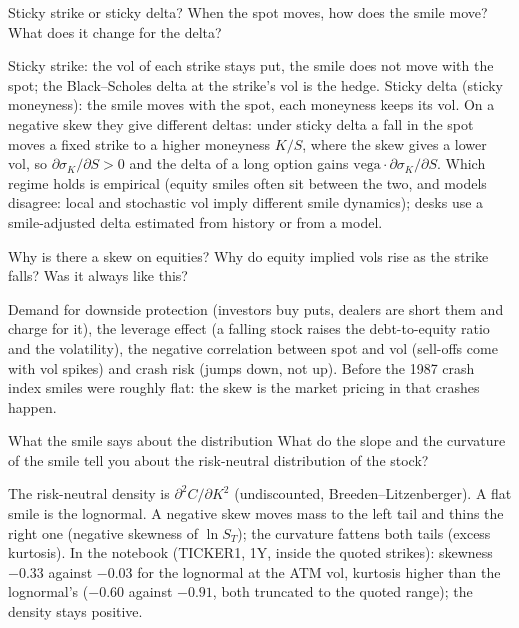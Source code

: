 \begin{question}{\Theory {}}{Sticky strike or sticky delta?}
When the spot moves, how does the smile move? What does it change for the delta?
\end{question}
\begin{answer}
Sticky strike: the vol of each strike stays put, the smile does not move with the spot; the Black--Scholes delta at
the strike's vol is the hedge. Sticky delta (sticky moneyness): the smile moves with the spot, each moneyness keeps its
vol. On a negative skew they give different deltas: under sticky delta a fall in the spot moves a fixed strike to a
higher moneyness $K/S$, where the skew gives a lower vol, so $\partial\sigma_K/\partial S > 0$ and the delta of a long
option gains $\text{vega}\cdot\partial\sigma_K/\partial S$. Which regime holds is empirical (equity smiles often sit
between the two, and models disagree: local and stochastic vol imply different smile dynamics); desks use a
smile-adjusted delta estimated from history or from a model.
\end{answer}

\begin{question}{\Theory {}}{Why is there a skew on equities?}
Why do equity implied vols rise as the strike falls? Was it always like this?
\end{question}
\begin{answer}
Demand for downside protection (investors buy puts, dealers are short them and charge for it), the leverage effect
(a falling stock raises the debt-to-equity ratio and the volatility), the negative correlation between spot and vol
(sell-offs come with vol spikes) and crash risk (jumps down, not up). Before the 1987 crash index smiles were roughly
flat: the skew is the market pricing in that crashes happen.
\end{answer}

\begin{question}{\Theory \Practice {}}{What the smile says about the distribution}
What do the slope and the curvature of the smile tell you about the risk-neutral distribution of the stock?
\end{question}
\begin{answer}
The risk-neutral density is $\partial^2C/\partial K^2$ (undiscounted, Breeden--Litzenberger). A flat smile is the
lognormal. A negative skew moves mass to the left tail and thins the right one (negative skewness of $\ln S_T$); the
curvature fattens both tails (excess kurtosis). In the notebook (TICKER1, 1Y, inside the quoted strikes): skewness
$-0.33$ against $-0.03$ for the lognormal at the ATM vol, kurtosis higher than the lognormal's ($-0.60$ against $-0.91$,
both truncated to the quoted range); the density stays positive.
\end{answer}

